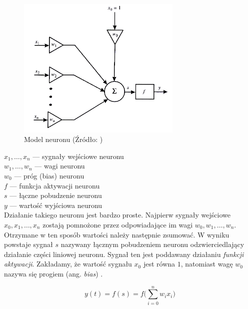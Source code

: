 \documentclass[a4paper,12pt]{article}
\numberwithin{equation}{section}
\begin{document}
\begin{figure}[H]
    \centering
    \includegraphics[width=0.7\textwidth]{sigmoid_neuron.png}
    \caption{Model neuronu (Źródło: \cite{book_rutkowski})}
    \label{fig:sigmoid_neuron}
\end{figure}

\noindent
$x_{1},\dots,x_{n}$ — sygnały wejściowe neuronu \vspace{0.3cm}\\
$w_{1},\dots,w_{n}$ — wagi neuronu \vspace{0.3cm}\\
$w_{0}$ — próg (bias) neuronu \vspace{0.3cm}\\
$f$ — funkcja aktywacji neuronu \vspace{0.3cm}\\
$s$ — łączne pobudzenie neuronu \vspace{0.3cm}\\
$y$ — wartość wyjściowa neuronu\\

Działanie takiego neuronu jest bardzo proste. Najpierw sygnały wejściowe $x_0,x_1,\dots,x_n$ zostają pomnożone przez odpowiadające im wagi $w_0,w_1,\dots,w_n$. Otrzymane w ten sposób wartości należy następnie zsumować. W wyniku powstaje sygnał $s$ nazywany łącznym pobudzeniem neuronu \cite{zajdel_6} odzwierciedlający działanie części liniowej neuronu. Sygnał ten jest poddawany działaniu \textit{funkcji aktywacji}. Zakładamy, że wartość sygnału $x_0$ jest równa $1$, natomiast wagę $w_0$ nazywa się progiem (ang. \textit{bias}) \cite{book_rutkowski}.

\begin{equation} \label{eq:neuron_output}
    y(t) = f(s) = f\Bigg(\sum_{i=0}^{n} w_i x_i \Bigg)
\end{equation}
\end{document}
